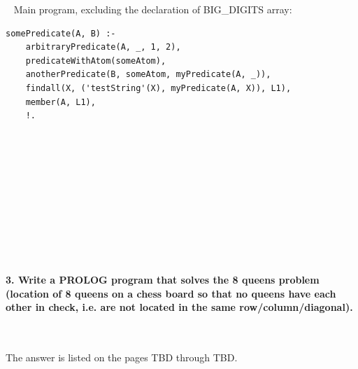 \documentclass{article}
\begin{document}
	\rmfamily\
	\newline
	\noindent Main program, excluding the declaration of BIG_DIGITS array:
	
	\begin{verbatim}
somePredicate(A, B) :-
    arbitraryPredicate(A, _, 1, 2),
    predicateWithAtom(someAtom),
    anotherPredicate(B, someAtom, myPredicate(A, _)),
    findall(X, ('testString'(X), myPredicate(A, X)), L1),
    member(A, L1),
    !.
	\end{verbatim}
	

	
\paragraph{}\
\paragraph{}\
\paragraph{}\
\paragraph{}\
\paragraph{}\


	
	\rmfamily
	
	\paragraph{3. Write a PROLOG program that solves the 8 queens problem (location of 8 queens on a chess board so that no queens have each other in check, i.e. are not located in the same row/column/diagonal). }\
	\newline
	\rmfamily\
	
	The answer is listed on the pages TBD through TBD.
	
	

		
\end{document}
